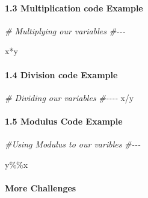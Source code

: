 \documentclass[
]{article}
\newenvironment{Shaded}{\begin{snugshade}}{\end{snugshade}}
\newcommand{\CommentTok}[1]{\textcolor[rgb]{0.56,0.35,0.01}{\textit{#1}}}
\newcommand{\NormalTok}[1]{#1}
\newcommand{\SpecialCharTok}[1]{\textcolor[rgb]{0.00,0.00,0.00}{#1}}
\begin{document}
\hypertarget{multiplication-code-example}{%
\paragraph{1.3 Multiplication code
Example}\label{multiplication-code-example}}

\begin{Shaded}
\begin{Highlighting}[]

\CommentTok{\# Multiplying our variables}
\CommentTok{\#{-}{-}{-}}

\NormalTok{x}\SpecialCharTok{*}\NormalTok{y}
\end{Highlighting}
\end{Shaded}

\hypertarget{division-code-example}{%
\paragraph{1.4 Division code Example}\label{division-code-example}}

\begin{Shaded}
\begin{Highlighting}[]

\CommentTok{\# Dividing our variables}
\CommentTok{\#{-}{-}{-}{-}}
\NormalTok{x}\SpecialCharTok{/}\NormalTok{y}
\end{Highlighting}
\end{Shaded}

\hypertarget{modulus-code-example}{%
\paragraph{1.5 Modulus Code Example}\label{modulus-code-example}}

\begin{Shaded}
\begin{Highlighting}[]

\CommentTok{\#Using Modulus to our varibles}
\CommentTok{\#{-}{-}{-}}

\NormalTok{y}\SpecialCharTok{\%\%}\NormalTok{x}
\end{Highlighting}
\end{Shaded}

\hypertarget{more-challenges}{%
\paragraph{More Challenges}\label{more-challenges}}
\end{document}
